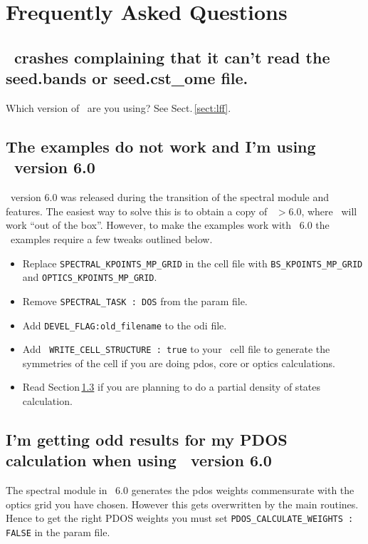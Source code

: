 \documentclass[a4paper,11pt,twoside]{book}
\begin{document}
{%




\chapter{Frequently Asked Questions}

\section{\optados\ crashes complaining that it can't read the
  seed.bands or seed.cst\_ome file.}
Which version of \castep\ are you using? See Sect.\,\ref{sect:lff}.

\section{The examples do not work and I'm using \castep\ version 6.0}
\castep\ version 6.0 was released during the transition of the spectral module and features. The easiest way to solve this is to obtain a  copy of \castep\ $>6.0$, where \optados\ will work ``out of the box''.  However, to make the examples work with \castep\ 6.0 the \optados\ examples require a few tweaks outlined below.
\begin{itemize}
\item Replace \verb#SPECTRAL_KPOINTS_MP_GRID# in the cell file with \verb#BS_KPOINTS_MP_GRID# and \verb#OPTICS_KPOINTS_MP_GRID#.
\item Remove \verb#SPECTRAL_TASK : DOS# from the param file.
\item Add \verb#DEVEL_FLAG:old_filename# to the odi file.
\item Add \verb# WRITE_CELL_STRUCTURE : true# to your \castep\ cell file to generate the symmetries of the cell if you are doing pdos, core or optics calculations.
\item Read Section\,\ref{pdos_castep_6.0} if you are planning to do a partial density of states calculation.
\end{itemize}

\section{I'm getting odd results for my PDOS calculation when using \castep\ version 6.0} \label{pdos_castep_6.0}
The spectral module in \castep\ 6.0 generates the pdos weights commensurate with the optics grid you have chosen. However this gets overwritten by the main routines. Hence to get the right PDOS weights you must set \verb#PDOS_CALCULATE_WEIGHTS : FALSE# in the param file.

}
\end{document}

